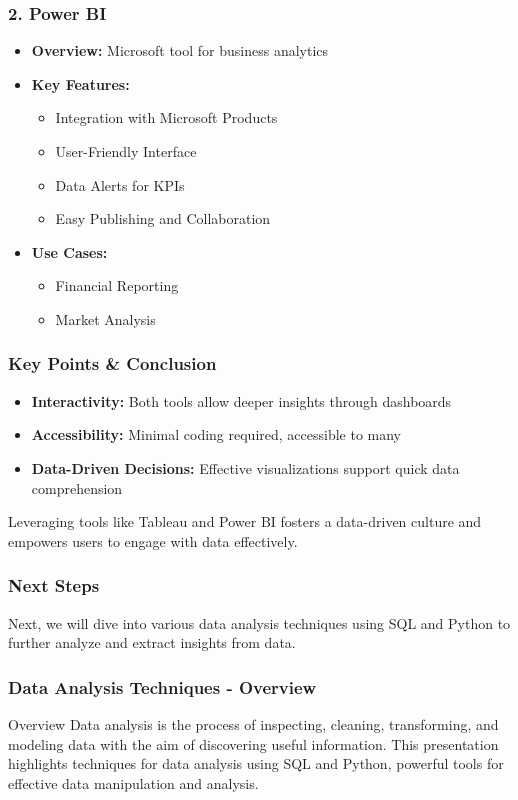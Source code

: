 \documentclass{beamer}
\begin{document}
\begin{frame}[fragile]
    \frametitle{2. Power BI}
    \begin{itemize}
        \item \textbf{Overview:} Microsoft tool for business analytics
        \item \textbf{Key Features:}
        \begin{itemize}
            \item Integration with Microsoft Products
            \item User-Friendly Interface
            \item Data Alerts for KPIs
            \item Easy Publishing and Collaboration
        \end{itemize}
        \item \textbf{Use Cases:}
        \begin{itemize}
            \item Financial Reporting
            \item Market Analysis
        \end{itemize}
    \end{itemize}
\end{frame}

\begin{frame}[fragile]
    \frametitle{Key Points & Conclusion}
    \begin{itemize}
        \item \textbf{Interactivity:} Both tools allow deeper insights through dashboards
        \item \textbf{Accessibility:} Minimal coding required, accessible to many
        \item \textbf{Data-Driven Decisions:} Effective visualizations support quick data comprehension
    \end{itemize}
    Leveraging tools like Tableau and Power BI fosters a data-driven culture and empowers users to engage with data effectively.
\end{frame}

\begin{frame}[fragile]
    \frametitle{Next Steps}
    Next, we will dive into various data analysis techniques using SQL and Python to further analyze and extract insights from data.
\end{frame}

\begin{frame}[fragile]
    \frametitle{Data Analysis Techniques - Overview}
    \begin{block}{Overview}
        Data analysis is the process of inspecting, cleaning, transforming, 
        and modeling data with the aim of discovering useful information. 
        This presentation highlights techniques for data analysis using 
        SQL and Python, powerful tools for effective data manipulation and analysis.
    \end{block}
\end{frame}
\end{document}
